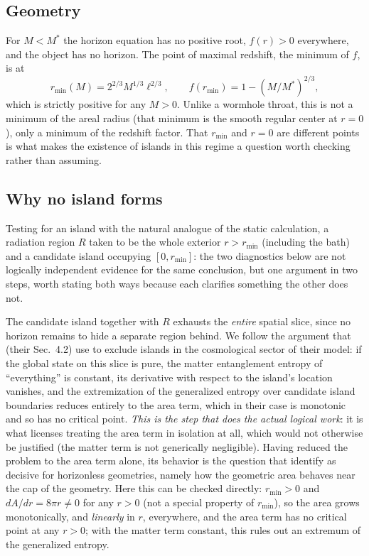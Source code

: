 \documentclass[11pt]{article}
\begin{document}
\subsection{Geometry}

For $M<M^*$ the horizon equation has no positive root, $f(r)>0$ everywhere, and the object has no horizon. The point of maximal redshift, the minimum of $f$, is at
\begin{equation}
r_{\min}(M)=2^{2/3}M^{1/3}\ell^{2/3},\qquad f(r_{\min})=1-(M/M^*)^{2/3},
\end{equation}
which is strictly positive for any $M>0$. Unlike a wormhole throat, this is not a minimum of the areal radius (that minimum is the smooth regular center at $r=0$), only a minimum of the redshift factor. That $r_{\min}$ and $r=0$ are different points is what makes the existence of islands in this regime a question worth checking rather than assuming.

\subsection{Why no island forms}

Testing for an island with the natural analogue of the static calculation, a radiation region $R$ taken to be the whole exterior $r>r_{\min}$ (including the bath) and a candidate island occupying $[0,r_{\min}]$: the two diagnostics below are not logically independent evidence for the same conclusion, but one argument in two steps, worth stating both ways because each clarifies something the other does not.

The candidate island together with $R$ exhausts the \emph{entire} spatial slice, since no horizon remains to hide a separate region behind. We follow the argument that \citet{Rusalev2025} (their Sec.~4.2) use to exclude islands in the cosmological sector of their model: if the global state on this slice is pure, the matter entanglement entropy of ``everything'' is constant, its derivative with respect to the island's location vanishes, and the extremization of the generalized entropy over candidate island boundaries reduces entirely to the area term, which in their case is monotonic and so has no critical point. \emph{This is the step that does the actual logical work}: it is what licenses treating the area term in isolation at all, which would not otherwise be justified (the matter term is not generically negligible). Having reduced the problem to the area term alone, its behavior is the question that \citet{AgeevZueva2026} identify as decisive for horizonless geometries, namely how the geometric area behaves near the cap of the geometry. Here this can be checked directly: $r_{\min}>0$ and $dA/dr=8\pi r\neq0$ for any $r>0$ (not a special property of $r_{\min}$), so the area grows monotonically, and \emph{linearly} in $r$, everywhere, and the area term has no critical point at any $r>0$; with the matter term constant, this rules out an extremum of the generalized entropy.
\end{document}
